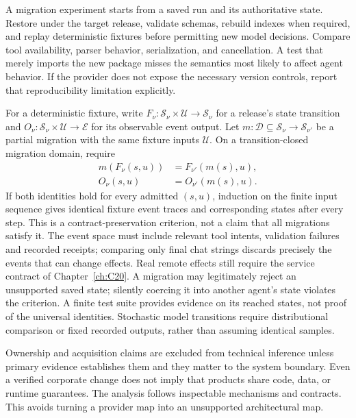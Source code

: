 A migration experiment starts from a saved run and its authoritative state. Restore under the target release, validate schemas, rebuild indexes when required, and replay deterministic fixtures before permitting new model decisions. Compare tool availability, parser behavior, serialization, and cancellation. A test that merely imports the new package misses the semantics most likely to affect agent behavior. If the provider does not expose the necessary version controls, report that reproducibility limitation explicitly.

For a deterministic fixture, write $F_\nu:\mathcal S_\nu\times\mathcal U\to\mathcal S_\nu$ for a release's state transition and $O_\nu:\mathcal S_\nu\times\mathcal U\to\mathcal E$ for its observable event output. Let $m:\mathcal D\subseteq\mathcal S_\nu\to\mathcal S_{\nu'}$ be a partial migration with the same fixture inputs $\mathcal U$. On a transition-closed migration domain, require
\begin{align}
 m(F_\nu(s,u))&=F_{\nu'}(m(s),u),\\
 O_\nu(s,u)&=O_{\nu'}(m(s),u).
 \label{eq:C22:migration_commutes}
\end{align}
If both identities hold for every admitted $(s,u)$, induction on the finite input sequence gives identical fixture event traces and corresponding states after every step. This is a contract-preservation criterion, not a claim that all migrations satisfy it. The event space must include relevant tool intents, validation failures and recorded receipts; comparing only final chat strings discards precisely the events that can change effects. Real remote effects still require the service contract of Chapter~\ref{ch:C20}. A migration may legitimately reject an unsupported saved state; silently coercing it into another agent's state violates the criterion. A finite test suite provides evidence on its reached states, not proof of the universal identities. Stochastic model transitions require distributional comparison or fixed recorded outputs, rather than assuming identical samples.

Ownership and acquisition claims are excluded from technical inference unless primary evidence establishes them and they matter to the system boundary. Even a verified corporate change does not imply that products share code, data, or runtime guarantees. The analysis follows inspectable mechanisms and contracts. This avoids turning a provider map into an unsupported architectural map.


